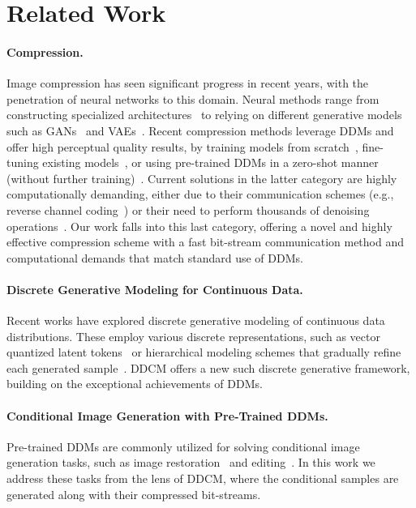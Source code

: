 \section{Related Work}\label{sec:related}

\paragraph{Compression.}
Image compression has seen significant progress in recent years, with the penetration of neural networks to this domain. Neural methods range from constructing specialized architectures~\citep{end-to-end-compression,zhu2022unified, jiang2023mlic,jiang2023mlicpp} to relying on different generative models such as GANs~\citep{mentzer2020high,muckley2023improving, iwai2024controlling} and VAEs~\citep{theis2017lossy}.
Recent compression methods leverage DDMs and offer high perceptual quality results, by training models from scratch~\citep{NEURIPS2023_ccf6d8b4, ghouse2023residual}, fine-tuning existing models~\cite{careil2023towards,korber2024perco}, or using pre-trained DDMs in a zero-shot manner (without further training)~\citep{theis2022lossy,elata2024zero}. 
Current solutions in the latter category are highly computationally demanding, either due to their communication schemes (e.g., reverse channel coding~\citep{pmlr-v162-theis22a,theis2022lossy}) or their need to perform thousands of denoising operations~\citep{elata2024zero}. Our work falls into this last category, offering a novel and highly effective compression scheme with a fast bit-stream communication method and computational demands that match standard use of DDMs.

\paragraph{Discrete Generative Modeling for Continuous Data.}
Recent works have explored discrete generative modeling of continuous data distributions.
These employ various discrete representations, such as vector quantized latent tokens~\citep{wu2024rdpm} or hierarchical modeling schemes that gradually refine each generated sample~\citep{yang2024discretedistributionnetworks}. DDCM offers a new such discrete generative framework, building on the exceptional achievements of DDMs.

\paragraph{Conditional Image Generation with Pre-Trained DDMs.}
Pre-trained DDMs are commonly utilized for solving conditional image generation tasks, such as image restoration~\citep{kawar2022denoising,lugmayr2022repaint,wang2023zeroshot, chung2023diffusion,2023diffbir, song2023pseudoinverseguided,cohen2024posterior, difface,raphaeli2025silosolvinginverseproblems,man2025proxiesdistortionconsistencyapplications}
and editing~\citep{meng2022sdedit, huberman2024edit, cohen2024slicedit, manor2024zeroshot}. 
In this work we address these tasks from the lens of DDCM, where the conditional samples are generated along with their compressed bit-streams.

